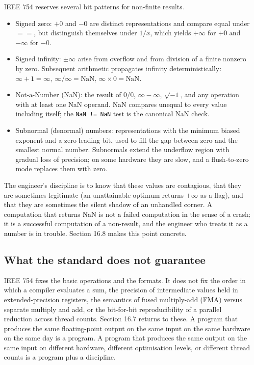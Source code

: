 IEEE 754 reserves several bit patterns for non-finite results.

\begin{itemize}[leftmargin=*]
  \item Signed zero: $+0$ and $-0$ are distinct representations and
    compare equal under $==$, but distinguish themselves under
    $1/x$, which yields $+\infty$ for $+0$ and $-\infty$ for $-0$.
  \item Signed infinity: $\pm\infty$ arise from overflow and from
    division of a finite nonzero by zero. Subsequent arithmetic
    propagates infinity deterministically: $\infty + 1 = \infty$,
    $\infty / \infty = \mathrm{NaN}$, $\infty \times 0 = \mathrm{NaN}$.
  \item Not-a-Number (NaN): the result of $0/0$, $\infty - \infty$,
    $\sqrt{-1}$, and any operation with at least one NaN operand.
    NaN compares unequal to every value including itself; the
    \texttt{NaN != NaN} test is the canonical NaN check.
  \item Subnormal (denormal) numbers: representations with the
    minimum biased exponent and a zero leading bit, used to fill the
    gap between zero and the smallest normal number. Subnormals
    extend the underflow region with gradual loss of precision; on
    some hardware they are slow, and a flush-to-zero mode replaces
    them with zero.
\end{itemize}

The engineer's discipline is to know that these values are
contagious, that they are sometimes legitimate (an unattainable
optimum returns $+\infty$ as a flag), and that they are sometimes
the silent shadow of an unhandled corner. A computation that
returns NaN is not a failed computation in the sense of a crash; it
is a successful computation of a non-result, and the engineer who
treats it as a number is in trouble. Section 16.8 makes this point
concrete.

\subsection{What the standard does not guarantee}

IEEE 754 fixes the basic operations and the formats. It does not
fix the order in which a compiler evaluates a sum, the precision
of intermediate values held in extended-precision registers, the
semantics of fused multiply-add (FMA) versus separate multiply and
add, or the bit-for-bit reproducibility of a parallel reduction
across thread counts. Section 16.7 returns to these. A program
that produces the same floating-point output on the same input on
the same hardware on the same day is a program. A program that
produces the same output on the same input on different hardware,
different optimisation levels, or different thread counts is a
program plus a discipline.

